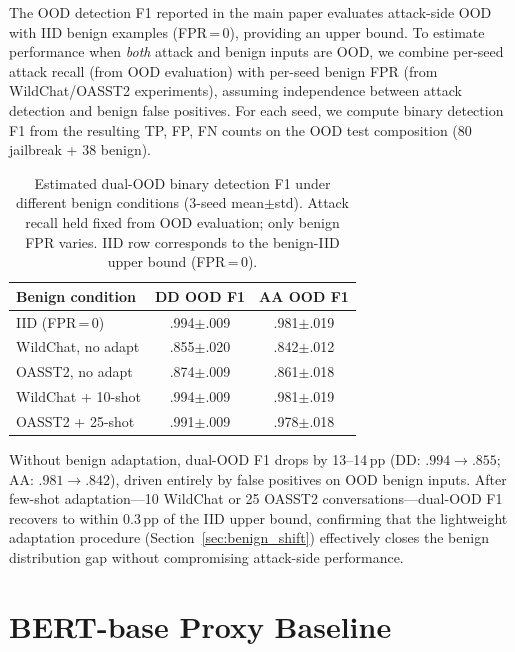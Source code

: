The OOD detection F1 reported in the main paper evaluates attack-side OOD with IID benign examples (FPR\,=\,0), providing an upper bound. To estimate performance when \emph{both} attack and benign inputs are OOD, we combine per-seed attack recall (from OOD evaluation) with per-seed benign FPR (from WildChat/OASST2 experiments), assuming independence between attack detection and benign false positives. For each seed, we compute binary detection F1 from the resulting TP, FP, FN counts on the OOD test composition (80 jailbreak + 38 benign).

\begin{table}[ht]
\centering
\footnotesize
\caption{Estimated dual-OOD binary detection F1 under different benign conditions (3-seed mean$\pm$std). Attack recall held fixed from OOD evaluation; only benign FPR varies. IID row corresponds to the benign-IID upper bound (FPR\,=\,0).}
\label{tab:dual_ood}
\begin{tabular}{@{}lcc@{}}
\toprule
\textbf{Benign condition} & DD OOD F1 & AA OOD F1 \\
\midrule
IID (FPR\,=\,0) & .994$\pm$.009 & .981$\pm$.019 \\
WildChat, no adapt & .855$\pm$.020 & .842$\pm$.012 \\
OASST2, no adapt & .874$\pm$.009 & .861$\pm$.018 \\
WildChat + 10-shot & .994$\pm$.009 & .981$\pm$.019 \\
OASST2 + 25-shot & .991$\pm$.009 & .978$\pm$.018 \\
\bottomrule
\end{tabular}
\end{table}

Without benign adaptation, dual-OOD F1 drops by 13--14\,pp (DD: $.994 \to .855$; AA: $.981 \to .842$), driven entirely by false positives on OOD benign inputs. After few-shot adaptation---10 WildChat or 25 OASST2 conversations---dual-OOD F1 recovers to within 0.3\,pp of the IID upper bound, confirming that the lightweight adaptation procedure (Section~\ref{sec:benign_shift}) effectively closes the benign distribution gap without compromising attack-side performance.

\section{BERT-base Proxy Baseline}
\label{app:bert_proxy}

